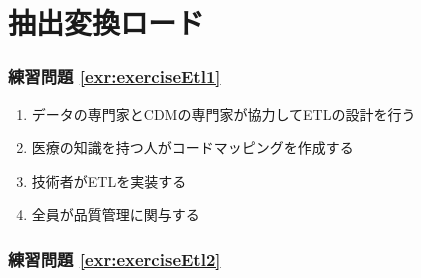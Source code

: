 \documentclass[
  11pt]{book}
\providecommand{\tightlist}{%
  \setlength{\itemsep}{0pt}\setlength{\parskip}{0pt}}
\theoremstyle{definition}
\theoremstyle{definition}
\theoremstyle{definition}
\theoremstyle{definition}
\theoremstyle{remark}
\begin{document}
\section{抽出変換ロード}\label{Etlanswers}

\subsubsection*{練習問題 \ref{exr:exerciseEtl1}}\label{ux7df4ux7fd2ux554fux984c-refexrexerciseetl1}

\begin{enumerate}
\def\labelenumi{\Alph{enumi})}
\tightlist
\item
  データの専門家とCDMの専門家が協力してETLの設計を行う
\item
  医療の知識を持つ人がコードマッピングを作成する
\item
  技術者がETLを実装する
\item
  全員が品質管理に関与する
\end{enumerate}

\subsubsection*{練習問題 \ref{exr:exerciseEtl2}}\label{ux7df4ux7fd2ux554fux984c-refexrexerciseetl2}
\end{document}
